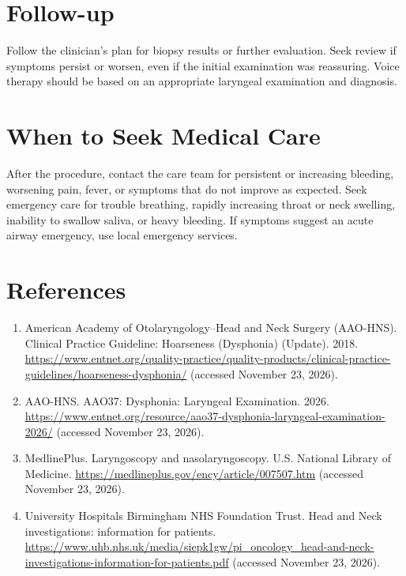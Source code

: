 \section*{Follow-up}
Follow the clinician's plan for biopsy results or further evaluation. Seek review if symptoms persist or worsen, even if the initial examination was reassuring. Voice therapy should be based on an appropriate laryngeal examination and diagnosis.

\section*{When to Seek Medical Care}
After the procedure, contact the care team for persistent or increasing bleeding, worsening pain, fever, or symptoms that do not improve as expected. Seek emergency care for trouble breathing, rapidly increasing throat or neck swelling, inability to swallow saliva, or heavy bleeding. If symptoms suggest an acute airway emergency, use local emergency services.

\section*{References}
\begin{enumerate}
  \item American Academy of Otolaryngology--Head and Neck Surgery (AAO-HNS). Clinical Practice Guideline: Hoarseness (Dysphonia) (Update). 2018. \url{https://www.entnet.org/quality-practice/quality-products/clinical-practice-guidelines/hoarseness-dysphonia/} (accessed November 23, 2026).
  \item AAO-HNS. AAO37: Dysphonia: Laryngeal Examination. 2026. \url{https://www.entnet.org/resource/aao37-dysphonia-laryngeal-examination-2026/} (accessed November 23, 2026).
  \item MedlinePlus. Laryngoscopy and nasolaryngoscopy. U.S. National Library of Medicine. \url{https://medlineplus.gov/ency/article/007507.htm} (accessed November 23, 2026).
  \item University Hospitals Birmingham NHS Foundation Trust. Head and Neck investigations: information for patients. \url{https://www.uhb.nhs.uk/media/siepk1gw/pi_oncology_head-and-neck-investigations-information-for-patients.pdf} (accessed November 23, 2026).
\end{enumerate}

\clearpage
